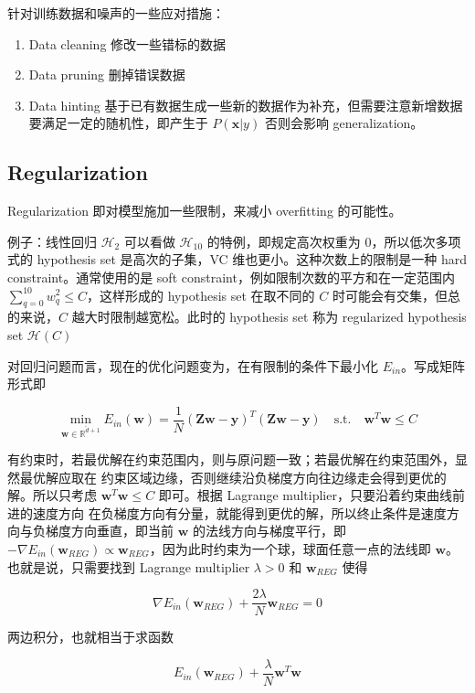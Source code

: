 \documentclass[a4paper]{article}
\begin{document}
针对训练数据和噪声的一些应对措施：
\begin{enumerate}
  \item Data cleaning 修改一些错标的数据
  \item Data pruning 删掉错误数据
  \item Data hinting 基于已有数据生成一些新的数据作为补充，但需要注意新增数据要满足一定的随机性，即产生于 $P(\mathbf{x} | y)$ 否则会影响 generalization。
\end{enumerate}


\subsection{Regularization}
Regularization 即对模型施加一些限制，来减小 overfitting 的可能性。

例子：线性回归 $\mathcal{H}_2$ 可以看做 $\mathcal{H}_{10}$ 的特例，即规定高次权重为 $0$，所以低次多项式的 hypothesis set 是高次的子集，VC 维也更小。这种次数上的限制是一种 hard constraint。通常使用的是 soft constraint，例如限制次数的平方和在一定范围内 $\displaystyle \sum_{q=0}^{10}w_q^2 \le C$，这样形成的 hypothesis set 在取不同的 $C$ 时可能会有交集，但总的来说，$C$ 越大时限制越宽松。此时的 hypothesis set 称为 regularized hypothesis set $\mathcal{H}(C)$

对回归问题而言，现在的优化问题变为，在有限制的条件下最小化 $E_{in}$。写成矩阵形式即

$$\min_{\mathbf{w} \in \mathbb{R}^{\tilde{d}+1}}E_{in}(\mathbf{w}) = \frac{1}{N}(\mathbf{Z}\mathbf{w} - \mathbf{y})^T(\mathbf{Z}\mathbf{w} - \mathbf{y}) \quad \text{s.t.} \quad \mathbf{w}^T\mathbf{w} \le C$$

有约束时，若最优解在约束范围内，则与原问题一致；若最优解在约束范围外，显然最优解应取在
约束区域边缘，否则继续沿负梯度方向往边缘走会得到更优的解。所以只考虑 $\mathbf{w}^T\mathbf{w} \le C$ 即可。根据 Lagrange multiplier，只要沿着约束曲线前进的速度方向
在负梯度方向有分量，就能得到更优的解，所以终止条件是速度方向与负梯度方向垂直，即当前 $\mathbf{w}$
的法线方向与梯度平行，即 $-\nabla E_{in}(\mathbf{w}_{REG}) \propto \mathbf{w}_{REG}$，因为此时约束为一个球，球面任意一点的法线即 $\mathbf{w}$。也就是说，只需要找到 Lagrange multiplier $\lambda > 0$ 和 $\mathbf{w}_{REG}$ 使得

$$\nabla E_{in}(\mathbf{w}_{REG}) + \frac{2\lambda}{N}\mathbf{w}_{REG} = 0$$

两边积分，也就相当于求函数

$$E_{in}(\mathbf{w}_{REG}) + \frac{\lambda}{N}\mathbf{w}^T\mathbf{w}$$
\end{document}
